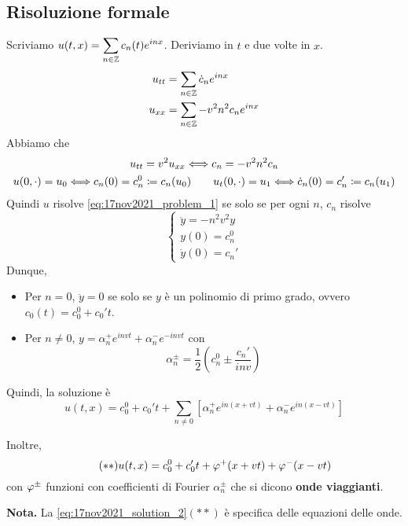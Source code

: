\subsection{Risoluzione formale}

Scriviamo $\displaystyle u(t,x) = \sum_{n \in \mathbb Z} c_n(t) e^{inx}$. Deriviamo in $t$ e due volte in $x$.
\begin{align*}
	u_{tt} & = \sum_{n \in \mathbb Z} \dot c_n e^{inx} \\
	u_{xx} & = \sum_{n \in \mathbb Z} - v^2 n^2 c_n e^{inx}
\end{align*}
Abbiamo che
\begin{gather*}
	u_{tt} = v^2 u_{xx} \Longleftrightarrow c_n = -v^2 n^2 c_n \\
	u(0, \cdot) = u_0 \Longleftrightarrow c_n(0) = c_n^0 \coloneqq c_n(u_0)
	\qquad
	u_t(0, \cdot) = u_1 \Longleftrightarrow \dot c_n(0) = c_n' \coloneqq c_n(u_1)
\end{gather*}
Quindi $u$ risolve \eqref{eq:17nov2021_problem_1} se solo se per ogni $n$, $c_n$ risolve
%
\begin{equation}
\tag{P$'$} \label{eq:17nov2021_problem_2}
\begin{cases}
	\ddot y = -n^2 v^2 y \\
	y(0) = c_n^0 \\
	\dot y(0) = c_n'
\end{cases} 
\end{equation}
%
Dunque,
\begin{itemize}

	\item Per $n = 0$, $\ddot y = 0$ se solo se $y$ è un polinomio di primo grado, ovvero $c_0(t) = c_0^0 + c_0' t$.


	\item Per $n \neq 0$, $y = \alpha_{n}^+ e^{invt} + \alpha_n^- e^{-invt} $ con 
	$$
		\alpha_n^{\pm} = \frac{1}{2} \left( c_n^0 \pm \frac{c_n'}{inv} \right)
	$$                                 

\end{itemize}
%
Quindi, la soluzione è
\begin{equation}
 \tag{$\ast$} \label{eq:17nov2021_solution_1}
	u(t,x) = c_0^0 + c_0' t + \sum_{n\neq 0} \left[ \alpha_n^+ e^{in(x + vt)} + \alpha_n^- e^{in(x - vt)} \right]
\end{equation}

Inoltre,
\begin{equation}
\tag{$\ast \ast$} \label{eq:17nov2021_solution_2}
	u(t,x) = c_0^0 + c_0' t + \varphi^+(x + vt) + \varphi^-(x - vt)
\end{equation}
con $\varphi^{\pm}$ funzioni con coefficienti di Fourier $\alpha_n^{\pm}$ che si dicono \textbf{onde viaggianti}.

\textbf{Nota.} La \eqref{eq:17nov2021_solution_2}$(\ast \ast)$ è specifica delle equazioni delle onde.
